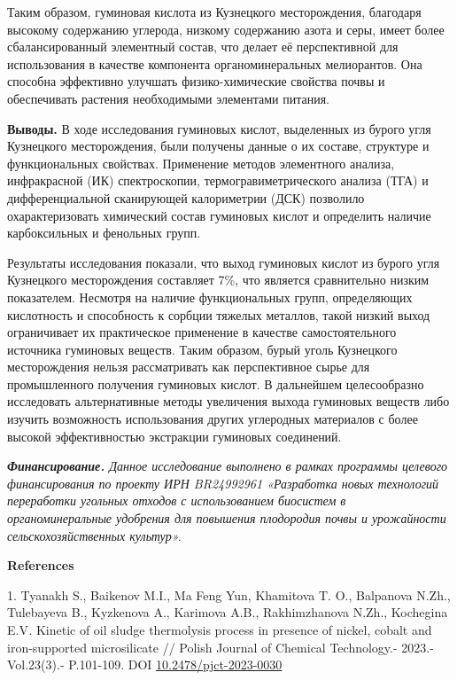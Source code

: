 Таким образом, гуминовая кислота из Кузнецкого месторождения, благодаря
высокому содержанию углерода, низкому содержанию азота и серы, имеет
более сбалансированный элементный состав, что делает её перспективной
для использования в качестве компонента органоминеральных мелиорантов.
Она способна эффективно улучшать физико-химические свойства почвы и
обеспечивать растения необходимыми элементами питания.

{\bfseries Выводы.} В ходе исследования гуминовых кислот, выделенных из
бурого угля Кузнецкого месторождения, были получены данные о их составе,
структуре и функциональных свойствах. Применение методов элементного
анализа, инфракрасной (ИК) спектроскопии, термогравиметрического анализа
(ТГА) и дифференциальной сканирующей калориметрии (ДСК) позволило
охарактеризовать химический состав гуминовых кислот и определить наличие
карбоксильных и фенольных групп.

Результаты исследования показали, что выход гуминовых кислот из бурого
угля Кузнецкого месторождения составляет 7\%, что является сравнительно
низким показателем. Несмотря на наличие функциональных групп,
определяющих кислотность и способность к сорбции тяжелых металлов, такой
низкий выход ограничивает их практическое применение в качестве
самостоятельного источника гуминовых веществ. Таким образом, бурый уголь
Кузнецкого месторождения нельзя рассматривать как перспективное сырье
для промышленного получения гуминовых кислот. В дальнейшем целесообразно
исследовать альтернативные методы увеличения выхода гуминовых веществ
либо изучить возможность использования других углеродных материалов с
более высокой эффективностью экстракции гуминовых соединений.

\emph{{\bfseries Финансирование.} Данное исследование выполнено в рамках
программы целевого финансирования по проекту ИРН BR24992961 «Разработка
новых технологий переработки угольных отходов с использованием биосистем
в органоминеральные удобрения для повышения плодородия почвы и
урожайности сельскохозяйственных культур».}

{\bfseries References}

1. Tyanakh S., Baikenov M.I., Ma Feng Yun, Khamitova T. O., Balpanova
N.Zh., Tulebayeva B., Kyzkenova A., Karimova A.B., Rakhimzhanova N.Zh.,
Kochegina E.V\emph{.} Kinetic of oil sludge thermolysis process in
presence of nickel, cobalt and iron-supported microsilicate // Polish
Journal of Chemical Technology.- 2023.- Vol.23(3).- P.101-109. DOI
\href{https://doi.org/10.2478/pjct-2023-0030}{10.2478/pjct-2023-0030}


